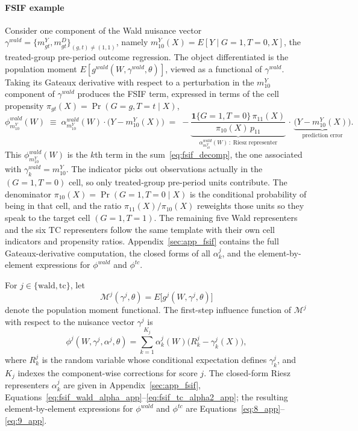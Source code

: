 \paragraph{FSIF example} Consider one component of the Wald nuisance vector $\gamma^{wald} = \{m^Y_{gt}, m^D_{gt}\}_{(g,t)\neq(1,1)}$, namely $m^Y_{10}(X) = E[Y \mid G=1,T=0,X]$, the treated-group pre-period outcome regression. The object differentiated is the population moment $E[g^{wald}(W,\gamma^{wald},\theta)]$, viewed as a functional of $\gamma^{wald}$. Taking its Gateaux derivative with respect to a perturbation in the $m^Y_{10}$ component of $\gamma^{wald}$ produces the FSIF term, expressed in terms of the cell propensity $\pi_{gt}(X) = \Pr(G=g, T=t \mid X)$,
\begin{equation}\label{eq:fsif_example}
    \phi^{wald}_{m^Y_{10}}(W)
    \;\equiv\; \alpha^{wald}_{m^Y_{10}}(W)\cdot\bigl(Y - m^Y_{10}(X)\bigr)
    \;=\; -\underbrace{\frac{\mathbf{1}\{G=1,T=0\}\,\pi_{11}(X)}{\pi_{10}(X)\,p_{11}}}_{\alpha^{wald}_{m^Y_{10}}(W)\,:\;\text{Riesz representer}}
    \,\cdot\,\underbrace{\bigl(Y - m^Y_{10}(X)\bigr)}_{\text{prediction error}}.
\end{equation}
This $\phi^{wald}_{m^Y_{10}}(W)$ is the $k$th term in the sum~\eqref{eq:fsif_decomp}, the one associated with $\gamma^{wald}_k = m^Y_{10}$. The indicator picks out observations actually in the $(G=1, T=0)$ cell, so only treated-group pre-period units contribute. The denominator $\pi_{10}(X) = \Pr(G=1, T=0 \mid X)$ is the conditional probability of being in that cell, and the ratio $\pi_{11}(X)/\pi_{10}(X)$ reweights those units so they speak to the target cell $(G=1, T=1)$. The remaining five Wald representers and the six TC representers follow the same template with their own cell indicators and propensity ratios. Appendix~\ref{sec:app_fsif} contains the full Gateaux-derivative computation, the closed forms of all $\alpha^j_k$, and the element-by-element expressions for $\phi^{wald}$ and $\phi^{tc}$.

\begin{proposition}\label{prop:2}
For $j\in\{\text{wald},\text{tc}\}$, let
\[
    \mathcal{M}^j(\gamma^j,\theta)
    =
    E\bigl[g^j(W,\gamma^j,\theta)\bigr]
\]
denote the population moment functional. The first-step influence function of $\mathcal{M}^j$ with respect to the nuisance vector $\gamma^j$ is
\[
    \phi^{j}(W,\gamma^j,\alpha^j,\theta)
    =
    \sum_{k=1}^{K_j}
    \alpha^{j}_k(W)\bigl(R^{j}_k-\gamma^{j}_k(X)\bigr),
\]
where $R^j_k$ is the random variable whose conditional expectation defines $\gamma^j_k$, and $K_j$ indexes the component-wise corrections for score $j$. The closed-form Riesz representers $\alpha^j_k$ are given in Appendix~\ref{sec:app_fsif}, Equations~\eqref{eq:fsif_wald_alpha_app}--\eqref{eq:fsif_tc_alpha2_app}; the resulting element-by-element expressions for $\phi^{wald}$ and $\phi^{tc}$ are Equations~\eqref{eq:8_app}--\eqref{eq:9_app}.
\end{proposition}

